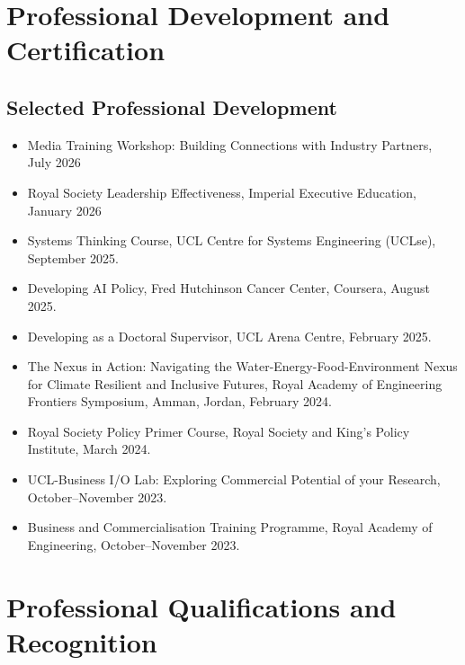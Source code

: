 \documentclass[a4paper,11pt]{article}
\begin{document}

\section{Professional Development and Certification}

\subsection*{Selected Professional Development}

\begin{itemize}
    \item Media Training Workshop: Building Connections with Industry Partners, July 2026
    \item Royal Society Leadership Effectiveness, Imperial Executive Education, January 2026
    \item Systems Thinking Course, UCL Centre for Systems Engineering (UCLse), September 2025.
    \item Developing AI Policy, Fred Hutchinson Cancer Center, Coursera, August 2025.
    \item Developing as a Doctoral Supervisor, UCL Arena Centre, February 2025.
    \item The Nexus in Action: Navigating the Water-Energy-Food-Environment Nexus for Climate Resilient and Inclusive Futures, Royal Academy of Engineering Frontiers Symposium, Amman, Jordan, February 2024.
    \item Royal Society Policy Primer Course, Royal Society and King's Policy Institute, March 2024.
    \item UCL-Business I/O Lab: Exploring Commercial Potential of your Research, October--November 2023.
    \item Business and Commercialisation Training Programme, Royal Academy of Engineering, October--November 2023.
\end{itemize}


\section{Professional Qualifications and Recognition}
\end{document}
